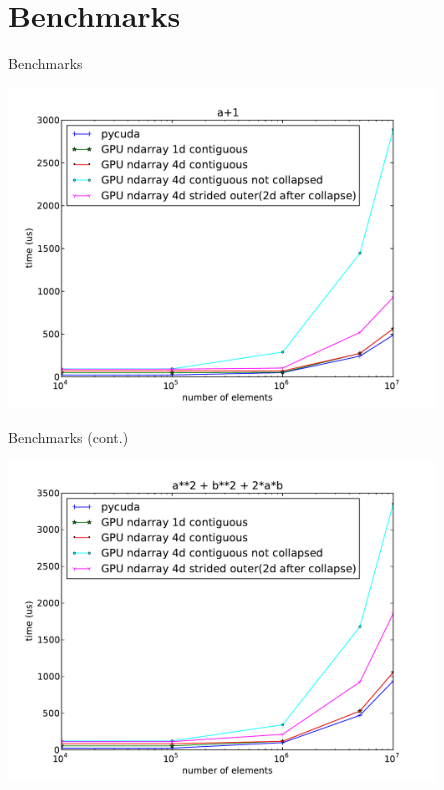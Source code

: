 \documentclass[utf8x,xcolor=pdftex,dvipsnames,table]{beamer}
\begin{document}
\section{Benchmarks}
\begin{frame}{Benchmarks}
\vspace{-1em}
\begin{center}
\includegraphics[width=0.85\textwidth]{ap1_no_alloc}
\end{center}
\end{frame}

\begin{frame}{Benchmarks (cont.)}
\vspace{-1em}
\begin{center}
\includegraphics[width=0.85\textwidth]{a2pb2p2ab_no_alloc}
\end{center}
\end{frame}
\end{document}

